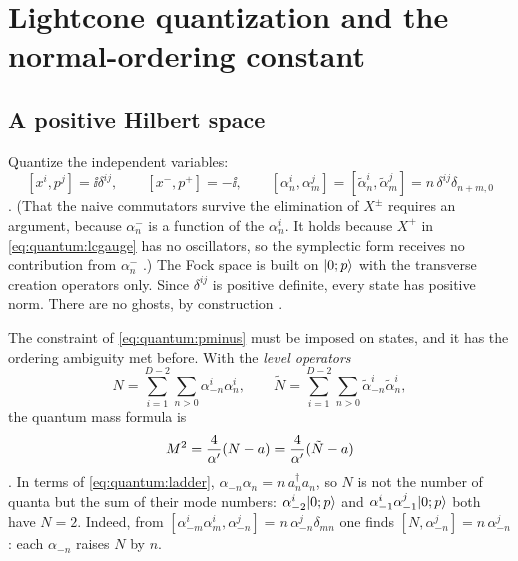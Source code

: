 \section{Lightcone quantization and the normal-ordering constant}\label{sec:quantum:a}

\subsection{A positive Hilbert space}

Quantize the independent variables:
\begin{equation}\label{eq:quantum:lcccr}
 [x^i,p^j]=\ii\delta^{ij},\qquad [x^-,p^+]=-\ii,\qquad
 [\alpha^i_n,\alpha^j_m]=[\tilde\alpha^i_n,\tilde\alpha^j_m]=n\,\delta^{ij}\delta_{n+m,0}
\end{equation}
. (That the naive commutators survive the elimination of
$X^\pm$ requires an argument, because $\alpha^-_n$ is a function of the $\alpha^i_n$. It
holds because $X^+$ in \cref{eq:quantum:lcgauge} has no oscillators, so the symplectic form
receives no contribution from $\alpha_n^-$ .) The Fock
space is built on $|0;p\rangle$ with the transverse creation operators only. Since
$\delta^{ij}$ is positive definite, every state has positive norm. There are no ghosts, by
construction .

The constraint of \cref{eq:quantum:pminus} must be imposed on states, and it has the ordering
ambiguity met before. With the \emph{level operators}
\begin{equation}\label{eq:quantum:N}
 N=\sum_{i=1}^{D-2}\sum_{n>0}\alpha^i_{-n}\alpha^i_n,\qquad
 \tilde N=\sum_{i=1}^{D-2}\sum_{n>0}\tilde\alpha^i_{-n}\tilde\alpha^i_n ,
\end{equation}
the quantum mass formula is
\begin{equation}\label{eq:quantum:massa}
 M^2=\frac4{\alpha'}(N-a)=\frac4{\alpha'}(\tilde N-a)
\end{equation}
. In terms of \cref{eq:quantum:ladder},
$\alpha_{-n}\alpha_n=n\,a_n^\dagger a_n$, so $N$ is not the number of quanta but the sum of
their mode numbers: $\alpha^i_{-2}|0;p\rangle$ and $\alpha^i_{-1}\alpha^j_{-1}|0;p\rangle$ both have
$N=2$. Indeed, from $[\alpha^i_{-m}\alpha^i_m,\alpha^j_{-n}]=n\,\alpha^j_{-n}\delta_{mn}$ one
finds $[N,\alpha^j_{-n}]=n\,\alpha^j_{-n}$: each $\alpha_{-n}$ raises $N$ by $n$.

